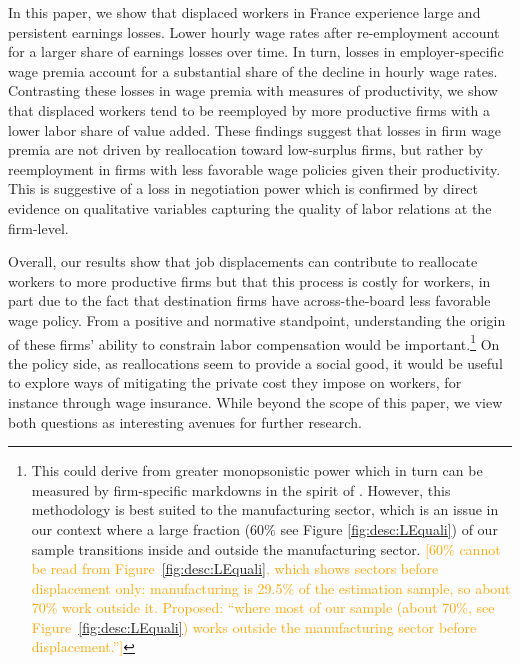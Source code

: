 

In this paper, we show that displaced workers in France experience large and persistent earnings losses. Lower hourly wage rates after re-employment account for a larger share of earnings losses over time. In turn, losses in employer-specific wage premia account for a substantial share of the decline in hourly wage rates. Contrasting these losses in wage premia with measures of productivity, we show that displaced workers tend to be reemployed by more productive firms with a lower labor share of value added. These findings suggest that losses in firm wage premia are not driven by reallocation toward low-surplus firms, but rather by reemployment in firms with less favorable wage policies given their productivity. This is suggestive of a loss in negotiation power which is confirmed by direct evidence on qualitative variables capturing the quality of labor relations at the firm-level.  

Overall, our results show that job displacements can contribute to reallocate workers to more productive firms but that this process is costly for workers, in part due to the fact that destination firms have across-the-board less favorable wage policy. From a positive and normative standpoint, understanding the origin of these firms' ability to constrain labor compensation would be important.\footnote{This could derive from greater monopsonistic power which in turn can be measured by firm-specific markdowns in the spirit of \cite{hershbein_macaluso_monopsony_2020}. However, this methodology is best suited to the manufacturing sector, which is an issue in our context where a large fraction (60\% see Figure \ref{fig:desc:LEquali}) of our sample transitions inside and outside the manufacturing sector. \textcolor{orange}{[60\% cannot be read from Figure~\ref{fig:desc:LEquali}, which shows sectors before displacement only: manufacturing is 29.5\% of the estimation sample, so about 70\% work outside it. Proposed: ``where most of our sample (about 70\%, see Figure~\ref{fig:desc:LEquali}) works outside the manufacturing sector before displacement.'']}} On the policy side, as reallocations seem to provide a social good, it would be useful to explore ways of mitigating the private cost they impose on workers, for instance through wage insurance. %
While beyond the scope of this paper, we view both questions as interesting avenues for further research.

